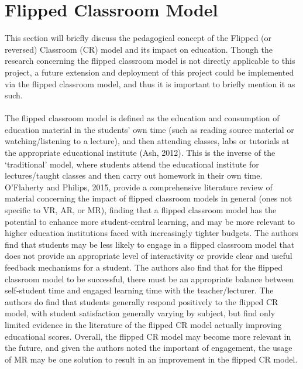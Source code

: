 \documentclass[11pt]{report}
\begin{document}
\section{Flipped Classroom Model}
This section will briefly discuss the pedagogical concept of the Flipped (or reversed) Classroom (CR) model and its impact on education. Though the research concerning the flipped classroom model is not directly applicable to this project, a future extension and deployment of this project could be implemented via the flipped classroom model, and thus it is important to briefly mention it as such.\\~\\
The flipped classroom model is defined as the education and consumption of education material in the students' own time (such as reading source material or watching/listening to a lecture), and then attending classes, labs or tutorials at the appropriate educational institute (Ash, 2012\cite{Ash2012}). This is the inverse of the `traditional' model, where students attend the educational institute for lectures/taught classes and then carry out homework in their own time. O'Flaherty and Philips, 2015\cite{OFlaherty2015}, provide a comprehensive literature review of material concerning the impact of flipped classroom models in general (ones not specific to VR, AR, or MR), finding that a flipped classroom model has the potential to enhance more student-central learning, and may be more relevant to higher education institutions faced with increasingly tighter budgets. The authors find that students may be less likely to engage in a flipped classroom model that does not provide an appropriate level of interactivity or provide clear and useful feedback mechanisms for a student. The authors also find that for the flipped classroom model to be successful, there must be an appropriate balance between self-student time and engaged learning time with the teacher/lecturer. The authors do find that students generally respond positively to the flipped CR model, with student satisfaction generally varying by subject, but find only limited evidence in the literature of the flipped CR model actually improving educational scores. Overall, the flipped CR model may become more relevant in the future, and given the authors noted the important of engagement, the usage of MR may be one solution to result in an improvement in the flipped CR model.
\end{document}
